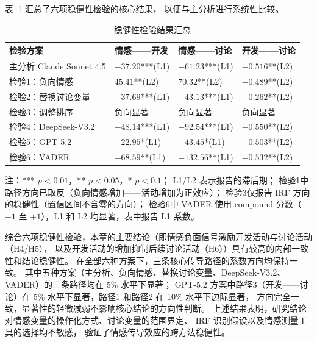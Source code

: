 \documentclass[
    type = master, %
    degree = professional,        %
    decl-page,  %
    twoside,                %
    fontset = fandol %
  ]{njuthesis}
\renewcommand{\footnotesize}{\zihao{-5}}
\begin{document}
表~\ref{tab:robustness} 汇总了六项稳健性检验的核心结果，
以便与主分析进行系统性比较。

\begin{table}[htbp]
    \centering
    \caption{稳健性检验结果汇总}
    \label{tab:robustness}
    \small
    \begin{tabularx}{\textwidth}{p{3.6cm}XXX}
        \toprule
        检验方案 & 情感——开发 & 情感——讨论 & 开发——讨论 \\
        \midrule
        主分析 Claude Sonnet 4.5 &
            $-37.20$***(L1) &
            $-61.23$***(L1) &
            $-0.516$**(L2) \\[3pt]
        检验1：负向情感 &
            $45.41$**(L2) &
            $70.32$**(L2) &
            $-0.489$**(L2) \\[3pt]
        检验2：替换讨论变量 &
            $-37.69$***(L1) &
            $-43.13$***(L1) &
            $-0.262$**(L2) \\[3pt]
        检验3：调整排序 &
            负向显著 &
            负向显著 &
            负向显著 \\[3pt]
        检验4：DeepSeek-V3.2 &
            $-48.14$***(L1) &
            $-92.54$***(L1) &
            $-0.550$**(L2) \\[3pt]
        检验5：GPT-5.2 &
            $-22.95$*(L1) &
            $-43.45$*(L1) &
            $-0.503$**(L2) \\[3pt]
        检验6：VADER &
            $-68.59$**(L1) &
            $-132.56$**(L1) &
            $-0.532$**(L2) \\
        \bottomrule
    \end{tabularx}
    \begin{minipage}{\textwidth}
        \vspace{0.3em}
        \footnotesize 注：*** $p<0.01$，** $p<0.05$，* $p<0.1$；
        L1/L2 表示报告的滞后期；
        检验1中路径方向已取反（负向情感增加——活动增加为正效应）；
        检验3仅报告 IRF 方向的稳健性（置信区间不含零的方向）；
        检验6中 VADER 使用 compound 分数（$-1$ 至 $+1$），L1 和 L2 均显著，表中报告 L1 系数。
    \end{minipage}
\end{table}

综合六项稳健性检验，本章的主要结论（即情感负面信号激励开发活动与讨论活动（H4/H5），
以及开发活动的增加抑制后续讨论活动（H6））具有较高的内部一致性和结论稳健性。
在全部六种方案下，三条核心传导路径的系数方向均保持一致。
其中五种方案（主分析、负向情感、替换讨论变量、DeepSeek-V3.2、VADER）的三条路径均在 5\% 水平下显著；
GPT-5.2 方案中路径3（开发——讨论）在 5\% 水平下显著，路径1 和路径2 在 10\% 水平下边际显著，
方向完全一致，显著性的轻微减弱不影响核心结论的方向性判断。
上述结果表明，研究结论对情感变量的操作化方式、讨论变量的范围界定、
IRF 识别假设以及情感测量工具的选择均不敏感，
验证了情感传导效应的跨方法稳健性。
\end{document}

